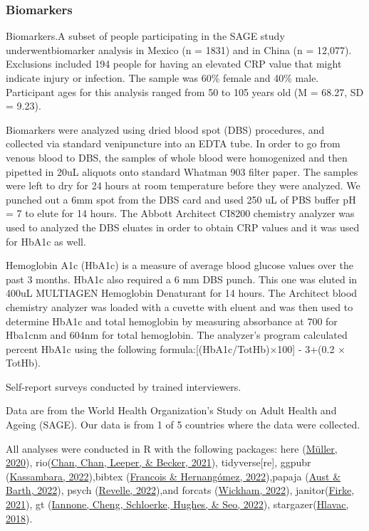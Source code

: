 \documentclass[
  man]{apa6}
\begin{document}
\hypertarget{biomarkers}{%
\subsubsection{Biomarkers}\label{biomarkers}}

Biomarkers.A subset of people participating in the SAGE study underwentbiomarker analysis in Mexico (n = 1831) and in China (n = 12,077). Exclusions included 194 people for having an elevated CRP value that might indicate injury or infection. The sample was 60\% female and 40\% male. Participant ages for this analysis ranged from 50 to 105 years old (M = 68.27, SD = 9.23).

Biomarkers were analyzed using dried blood spot (DBS) procedures, and collected via standard venipuncture into an EDTA tube. In order to go from venous blood to DBS, the samples of whole blood were homogenized and then pipetted in 20uL aliquots onto standard Whatman 903 filter paper. The samples were left to dry for 24 hours at room temperature before they were analyzed. We punched out a 6mm spot from the DBS card and used 250 uL of PBS buffer pH = 7 to elute for 14 hours. The Abbott Architect CI8200 chemistry analyzer was used to analyzed the DBS eluates in order to obtain CRP values and it was used for HbA1c as well.

Hemoglobin A1c (HbA1c) is a measure of average blood glucose values over the past 3 months. HbA1c also required a 6 mm DBS punch. This one was eluted in 400uL MULTIAGEN Hemoglobin Denaturant for 14 hours. The Architect blood chemistry analyzer was loaded with a cuvette with eluent and was then used to determine HbA1c and total hemoglobin by measuring absorbance at 700 for Hba1cnm and 604nm for total hemoglobin. The analyzer's program calculated percent HbA1c using the following formula:{[}(HbA1c/TotHb)×100{]} - 3+(0.2 × TotHb).

Self-report surveys conducted by trained interviewers.

Data are from the World Health Organization's Study on Adult Health and Ageing (SAGE). Our data is from 1 of 5 countries where the data were collected.

All analyses were conducted in R with the following packages:
here (\protect\hyperlink{ref-here}{Müller, 2020}), rio(\protect\hyperlink{ref-chanRioSwissarmyKnife2021a}{Chan, Chan, Leeper, \& Becker, 2021}), tidyverse{[}re{]}, ggpubr (\protect\hyperlink{ref-kassambaraGgpubrGgplot2Based2022}{Kassambara, 2022}),bibtex (\protect\hyperlink{ref-francoisBibtexBibtexParser2022}{Francois \& Hernangómez, 2022}),papaja (\protect\hyperlink{ref-austPapajaPrepareReproducible2022}{Aust \& Barth, 2022}), psych
(\protect\hyperlink{ref-revellePsychProceduresPsychological2022}{Revelle, 2022}),and forcats (\protect\hyperlink{ref-wickhamForcatsToolsWorking2022}{Wickham, 2022}), janitor(\protect\hyperlink{ref-firkeJanitorSimpleTools2021}{Firke, 2021}), gt (\protect\hyperlink{ref-iannoneGtEasilyCreate2022}{Iannone, Cheng, Schloerke, Hughes, \& Seo, 2022}), stargazer(\protect\hyperlink{ref-hlavacStargazerWellformattedRegression2018}{Hlavac, 2018}).
\end{document}
